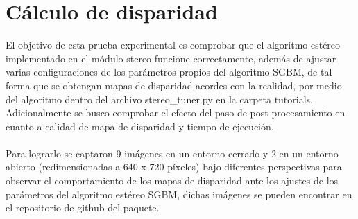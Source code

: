 \section{Cálculo de disparidad}
El objetivo de esta prueba experimental es comprobar que el algoritmo estéreo implementado en el módulo stereo funcione correctamente, además de ajustar varias configuraciones de los parámetros propios del algoritmo SGBM, de tal forma que se obtengan mapas de disparidad acordes con la realidad, por medio del algoritmo dentro del archivo stereo\_tuner.py en la carpeta tutorials. Adicionalmente se busco comprobar el efecto del paso de post-procesamiento en cuanto a calidad de mapa de disparidad y tiempo de ejecución.
\\
\\
Para lograrlo se captaron 9 imágenes en un entorno cerrado y 2 en un entorno abierto (redimensionadas a 640 x 720 píxeles) bajo diferentes perspectivas para observar el comportamiento de los mapas de disparidad ante los ajustes de los parámetros del algoritmo estéreo SGBM, dichas imágenes se pueden encontrar en el repositorio de github del paquete.
